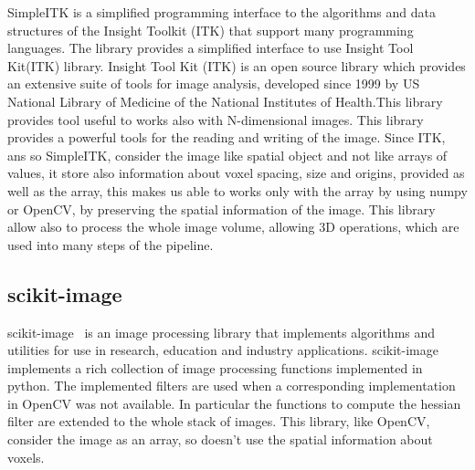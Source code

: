 \documentclass{standalone}
\begin{document}
	SimpleITK is a simplified programming interface to the algorithms and data structures of the Insight Toolkit (ITK) that support many programming languages. The library provides a simplified interface to use Insight Tool Kit(ITK) library. 
	Insight Tool Kit (ITK) is an open source library which provides an extensive suite of tools for image analysis, developed since 1999 by US National Library of Medicine of the National Institutes of Health.This library provides tool useful to works also with N-dimensional images. 
	This library provides a powerful tools for the reading and writing of the image. Since ITK, ans so SimpleITK,  consider the image like spatial object and not like arrays of values, it store also information about voxel spacing, size and origins, provided as well as the array, this makes us able to works only with the array by using numpy or OpenCV, by preserving the spatial information of the image. This library allow also to process the whole image volume, allowing 3D operations, which are used into many steps of the pipeline.
	
	 \subsection{scikit-image}
	 scikit-image~\cite{scikit-image} is an image processing library that implements algorithms and utilities for use in research, education and industry applications. scikit-image implements a rich collection of image processing functions implemented in python. The implemented filters are used when a corresponding implementation in OpenCV was not available. In particular the functions to compute the hessian filter are extended to the whole stack of images. This library, like OpenCV, consider the image as an array, so doesn't use the spatial information about voxels.
	
	 
\end{document}
